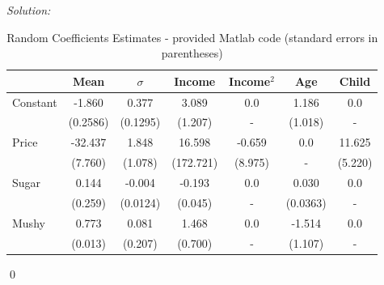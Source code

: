 \documentclass[12pt]{article}
\newenvironment{problem}[2][Problem]{\begin{trivlist}
\item[\hskip \labelsep {\bfseries #1}\hskip \labelsep {\bfseries #2.}]}{\end{trivlist}}
\newenvironment{sol}
    {\emph{Solution:}
    }
    {
    \qed
    }
\begin{document}
\begin{sol}
\begin{center}
\begin{table}[htbp]
            \centering
            \caption{Random Coefficients Estimates - provided Matlab code (standard errors in parentheses)}
              \begin{tabular}{lcccccc}
                  \toprule
                        & Mean          & $\sigma$ & Income & Income$^2$ & Age & Child        \\
                    \midrule
                    Constant &    -1.860& 0.377 & 3.089 & 0.0 & 1.186 & 0.0   \\
                    & (0.2586) & (0.1295) & (1.207)& - & (1.018) & -\\
                    Price &    -32.437  & 1.848 & 16.598 & -0.659 & 0.0 & 11.625 \\
                    &  (7.760) & (1.078) & (172.721) & (8.975) & - & (5.220)        \\
                    Sugar & 0.144& -0.004 & -0.193 & 0.0&  0.030& 0.0\\
                    & (0.259)& (0.0124) & (0.045) & - & (0.0363)& -\\
                    Mushy &  0.773 & 0.081 & 1.468 & 0.0 & -1.514 & 0.0   \\
                    & (0.013)& (0.207) & (0.700)&-& (1.107) & -\\
                  \bottomrule
              \end{tabular}
            \label{tab:blp_matlab}
          \end{table}
    \end{center}
\end{sol}
\begin{problem}{6}
\end{problem}
\end{document}
